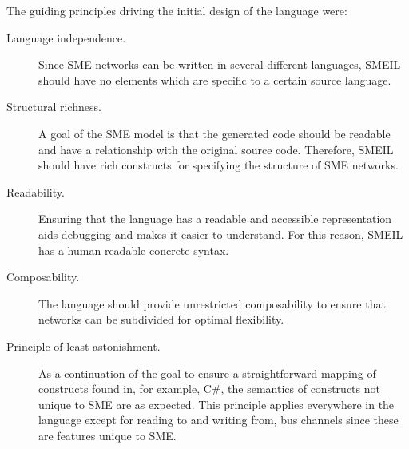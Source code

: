 

The guiding principles driving the initial design of the language were:
\begin{description}
\item[Language independence.] Since SME networks can be written in several
  different languages, SMEIL should have no elements which are specific to a
  certain source language.
\item[Structural richness.] A goal of the SME model is that the generated code
  should be readable and have a relationship with the original source
  code. Therefore, SMEIL should have rich constructs for specifying the
  structure of SME networks.
\item[Readability.] Ensuring that the language has a readable and accessible
  representation aids debugging and makes it easier to understand. For this
  reason, SMEIL has a human-readable concrete syntax.
\item[Composability.] The language should provide unrestricted composability to
  ensure that networks can be subdivided for optimal flexibility.
\item[Principle of least astonishment.]
  As a continuation of the goal to ensure a straightforward mapping of
  constructs found in, for example, C\#, the semantics of constructs not unique
  to SME are as expected. This principle applies everywhere in the language
  except for reading to and writing from, bus channels since these are features
  unique to SME.
\end{description}




